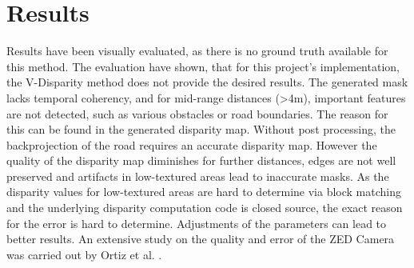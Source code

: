 
\chapter{Results}
\label{chp:Results}

Results have been visually evaluated, as there is no ground truth available for this method. 
The evaluation have shown, that for this project's implementation, the V-Disparity method does not provide the desired results. The generated mask lacks temporal coherency, and for mid-range distances (>4m), important features are not detected, such as various obstacles or road boundaries.
\newline
The reason for this can be found in the generated disparity map. Without post processing, the backprojection of the road requires an accurate disparity map. However the quality of the disparity map diminishes for further distances, edges are not well preserved and artifacts in low-textured areas lead to inaccurate masks. As the disparity values for low-textured areas are hard to determine via block matching and the underlying disparity computation code is closed source, the exact reason for the error is hard to determine. 
\newline
Adjustments of the parameters can lead to better results. An extensive study on the quality and error of the ZED Camera was carried out by Ortiz et al. \cite{Ortiz2018}.